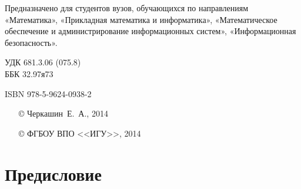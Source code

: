 \documentclass[a4paper,14pt, openany, twoside, draft]{extbook} %
\begin{document}
\begin{mygroup}
\begin{minipage}[t]{0.95\linewidth}
Предназначено для студентов вузов, обучающихся по направлениям «Математика», «Прикладная математика и информатика», «Математическое обеспечение и администрирование информационных систем», «Информационная безопасность».




\mbox{}
\endgroup
\end{minipage}
\mbox{}\hspace{0.7\linewidth}
\begin{minipage}{0.3\linewidth}\small
\noindent УДК 681.3.06 (075.8)\\
\noindent ББК 32.97я73
\end{minipage}

\vfill
\noindent\begin{minipage}[t]{0.35\linewidth}\small
\noindent ISBN 978-5-9624-0938-2
\end{minipage}%
\begin{minipage}[t]{0.65\linewidth}\small
\begin{itemize}
\setlength{\itemsep}{-0.5ex}
\setlength{\parsep}{0pt}
\item[\copyright{}] Черкашин~Е.~А., 2014
\item[\copyright{}] ФГБОУ ВПО <<ИГУ>>, 2014
\end{itemize}
\end{minipage}
\end{mygroup}
\clearpage
\tableofcontents
\clearpage

\newpage
\chapter*{Предисловие}
\end{document}
